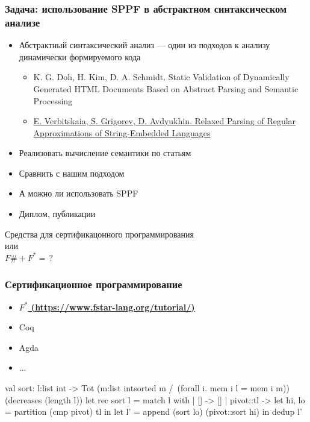 \documentclass{beamer}
\begin{document}
\begin{frame}
  \transwipe[direction=90]
  \frametitle{Задача: использование SPPF в абстрактном синтаксическом анализе}
  \begin{itemize}
    \item Абстрактный синтаксический анализ --- один из подходов к анализу динамически формируемого кода
    \begin{itemize}
        \item K. G. Doh, H. Kim, D. A. Schmidt. Static Validation of Dynamically Generated HTML Documents Based on Abstract Parsing and Semantic Processing
        \item \href{https://github.com/YaccConstructor/articles/blob/master/2015/PSI/paper/psi_2015.pdf}{E. Verbitskaia, S. Grigorev, D. Avdyukhin. Relaxed Parsing of Regular Approximations of String-Embedded Languages}
    \end{itemize} 
    \item Реализовать вычисление семантики по статьям
    \item Сравнить с нашим подходом
    \item А можно ли использовать SPPF
    \item Диплом, публикации
  \end{itemize}
\end{frame}

\begin{frame}[plain,c]
 \transwipe[direction=90]
 \begin{center}
  \Huge Средства для сертификацонного программирования \\ или \\ $F\# + F^* = \, ?$
 \end{center}
\end{frame}

\begin{frame}[fragile]
  \transwipe[direction=90]
  \frametitle{Сертификационное программирование}
  \begin{itemize}
    \item \underline{\bfseries{$F^*$} (\url{https://www.fstar-lang.org/tutorial/})}
    \item Coq
    \item Agda
    \item ...
  \end{itemize}

\begin{pyglist}[language=ocaml]
val sort: l:list int -> 
          Tot (m:list int{sorted m 
                          /\ (forall i. mem i l = mem i m)})
          (decreases (length l))
let rec sort l = match l with
  | [] -> []
  | pivot::tl ->
    let hi, lo = partition (cmp pivot) tl in
    let l' = append (sort lo) (pivot::sort hi) in
    dedup l' 
\end{pyglist}

\begin{verbatim}
\end{verbatim}

\end{frame}
\end{document}
